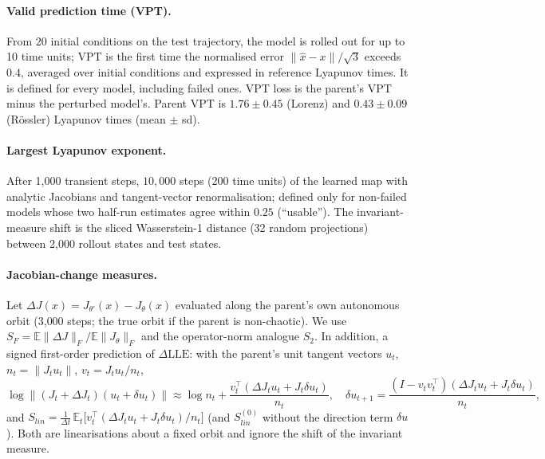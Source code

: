 \documentclass[11pt]{article}
\newcommand{\LLE}{\mathrm{LLE}}
\begin{document}
\paragraph{Valid prediction time (VPT).} From 20 initial conditions on the test trajectory, the model is rolled out for up to 10 time units; VPT is the first time the normalised error $\|\hat x-x\|/\sqrt{3}$ exceeds $0.4$, averaged over initial conditions and expressed in reference Lyapunov times. It is defined for every model, including failed ones. VPT loss is the parent's VPT minus the perturbed model's. Parent VPT is $1.76\pm0.45$ (Lorenz) and $0.43\pm0.09$ (R\"ossler) Lyapunov times (mean $\pm$ sd).

\paragraph{Largest Lyapunov exponent.} After 1{,}000 transient steps, $10{,}000$ steps (200 time units) of the learned map with analytic Jacobians and tangent-vector renormalisation; defined only for non-failed models whose two half-run estimates agree within $0.25$ (``usable''). The invariant-measure shift is the sliced Wasserstein-1 distance (32 random projections) between 2{,}000 rollout states and test states.

\paragraph{Jacobian-change measures.} Let $\Delta J(x)=J_{\theta'}(x)-J_\theta(x)$ evaluated along the parent's own autonomous orbit (3{,}000 steps; the true orbit if the parent is non-chaotic). We use $S_F=\mathbb{E}\|\Delta J\|_F/\mathbb{E}\|J_\theta\|_F$ and the operator-norm analogue $S_2$. In addition, a signed first-order prediction of $\Delta\LLE$: with the parent's unit tangent vectors $u_t$, $n_t=\|J_tu_t\|$, $v_t=J_tu_t/n_t$,
\[
\log\|(J_t+\Delta J_t)(u_t+\delta u_t)\|\approx\log n_t+\frac{v_t^\top(\Delta J_t u_t+J_t\delta u_t)}{n_t},\quad
\delta u_{t+1}=\frac{(I-v_tv_t^\top)(\Delta J_tu_t+J_t\delta u_t)}{n_t},
\]
and $S_{lin}=\frac{1}{\Delta t}\,\mathbb{E}_t\big[v_t^\top(\Delta J_tu_t+J_t\delta u_t)/n_t\big]$ (and $S_{lin}^{(0)}$ without the direction term $\delta u$). Both are linearisations about a fixed orbit and ignore the shift of the invariant measure.
\end{document}
